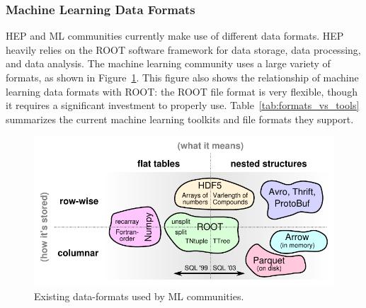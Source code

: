 \subsubsection{Machine Learning Data Formats}\label{sec:data_formats}

HEP and ML communities currently make use of different data formats. HEP heavily relies on the ROOT software framework for data storage, data processing, and data analysis. The machine learning community uses a large variety of formats, as shown in Figure~\ref{fig:data-formats}. This figure also shows the relationship of machine learning data formats with ROOT: the ROOT file format is very flexible, though it requires a significant investment to properly use. Table~\ref{tab:formats_vs_tools} summarizes the current machine learning toolkits and file formats they support.
\begin{figure}[htbp]
 \centering
 \includegraphics{images/table-of-formats.pdf}
 \caption{Existing data-formats used by ML communities.}\label{fig:data-formats}
\end{figure}


